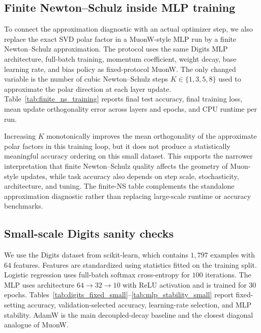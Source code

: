 \documentclass[sigconf,nonacm]{acmart}
\begin{document}
\subsection{Finite Newton--Schulz inside MLP training}\label{sec:finite_ns_training}
To connect the approximation diagnostic with an actual optimizer step, we also replace the exact SVD polar factor in a MuonW-style MLP run by a finite Newton--Schulz approximation. The protocol uses the same Digits MLP architecture, full-batch training, momentum coefficient, weight decay, base learning rate, and bias policy as fixed-protocol MuonW. The only changed variable is the number of cubic Newton--Schulz steps $K\in\{1,3,5,8\}$ used to approximate the polar direction at each layer update. Table~\ref{tab:finite_ns_training} reports final test accuracy, final training loss, mean update orthogonality error across layers and epochs, and CPU runtime per run.

\begin{table}[t]
    \centering
    \caption{Finite Newton--Schulz MuonW training diagnostic on the Digits MLP. Accuracy, orthogonality error, and runtime are averaged over five stratified splits.}
    \label{tab:finite_ns_training}
    
\end{table}

Increasing $K$ monotonically improves the mean orthogonality of the approximate polar factors in this training loop, but it does not produce a statistically meaningful accuracy ordering on this small dataset. This supports the narrower interpretation that finite Newton--Schulz quality affects the geometry of Muon-style updates, while task accuracy also depends on step scale, stochasticity, architecture, and tuning. The finite-NS table complements the standalone approximation diagnostic rather than replacing large-scale runtime or accuracy benchmarks.

\subsection{Small-scale Digits sanity checks}
We use the Digits dataset from scikit-learn, which contains $1,797$ examples with $64$ features. Features are standardized using statistics fitted on the training split. Logistic regression uses full-batch softmax cross-entropy for $100$ iterations. The MLP uses architecture $64\to32\to10$ with ReLU activation and is trained for $30$ epochs. Tables~\ref{tab:digits_fixed_small}--\ref{tab:mlp_stability_small} report fixed-setting accuracy, validation-selected accuracy, learning-rate selection, and MLP stability. AdamW is the main decoupled-decay baseline and the closest diagonal analogue of MuonW.
\end{document}
